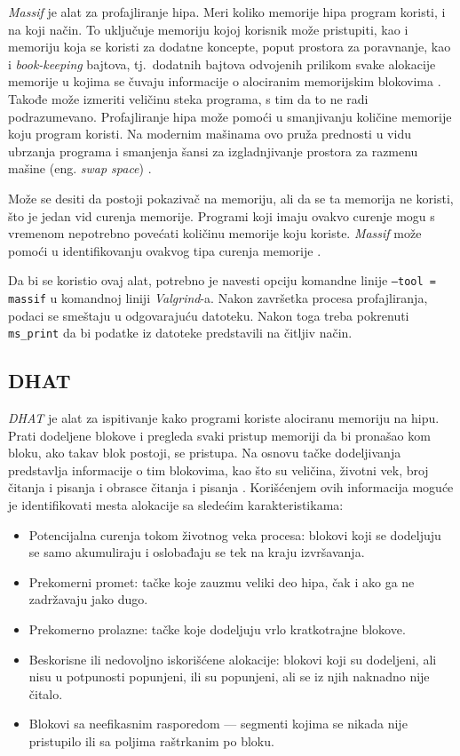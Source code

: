 \documentclass[12pt,oneside]{memoir}
\theoremstyle{plain}
\theoremstyle{definition}
\begin{document}
\textit{Massif} je alat za profajliranje hipa. Meri koliko memorije hipa program koristi, i na koji način. To uključuje memoriju kojoj korisnik može pristupiti, kao i memoriju koja se koristi za dodatne koncepte, poput prostora za poravnanje, kao i \textit{book-keeping} bajtova, tj.~dodatnih bajtova odvojenih prilikom svake alokacije memorije u kojima se čuvaju informacije o alociranim memorijskim blokovima \cite{Massif}. Takođe može izmeriti veličinu steka  programa, s tim da to ne radi podrazumevano. Profajliranje hipa može pomoći u smanjivanju količine memorije koju program koristi. Na modernim mašinama ovo pruža prednosti u vidu ubrzanja programa i smanjenja šansi za izgladnjivanje prostora za razmenu mašine (eng. \textit{swap space}) \cite{Massif}.

Može se desiti da postoji pokazivač na memoriju, ali da se ta memorija ne koristi, što je jedan vid curenja memorije. Programi koji imaju ovakvo curenje mogu s vremenom nepotrebno povećati količinu memorije koju koriste. \textit{Massif} može pomoći u identifikovanju ovakvog tipa curenja memorije \cite{Massif}.

Da bi se koristio ovaj alat, potrebno je navesti opciju komandne linije \texttt{--tool = massif} u komandnoj liniji \textit{Valgrind}-a. Nakon završetka procesa profajliranja, podaci se smeštaju u odgovarajuću datoteku. Nakon toga treba pokrenuti \texttt{ms\_print} da bi podatke iz datoteke predstavili na čitljiv način. 

\subsection{DHAT}

\textit{DHAT} je alat za ispitivanje kako programi koriste alociranu memoriju na hipu. Prati dodeljene blokove i pregleda svaki pristup memoriji da bi pronašao kom bloku, ako takav blok postoji, se pristupa. Na osnovu tačke dodeljivanja predstavlja informacije o tim blokovima, kao što su veličina, životni vek, broj čitanja i pisanja i obrasce čitanja i pisanja \cite{DHAT}. Korišćenjem ovih informacija moguće je identifikovati mesta alokacije sa sledećim karakteristikama:
\begin{itemize}
\item Potencijalna curenja tokom životnog veka procesa: blokovi koji se dodeljuju se samo akumuliraju i oslobađaju se tek na kraju izvršavanja.
\item Prekomerni promet: tačke koje zauzmu veliki deo hipa, čak i ako ga ne zadržavaju jako dugo.
\item Prekomerno prolazne: tačke koje dodeljuju vrlo kratkotrajne blokove.
\item Beskorisne ili nedovoljno iskorišćene alokacije: blokovi koji su dodeljeni, ali nisu u potpunosti popunjeni, ili su popunjeni, ali se iz njih naknadno nije čitalo.
\item Blokovi sa neefikasnim rasporedom --- segmenti kojima se nikada nije pristupilo ili sa poljima raštrkanim po bloku.
\end{itemize}
\end{document}
